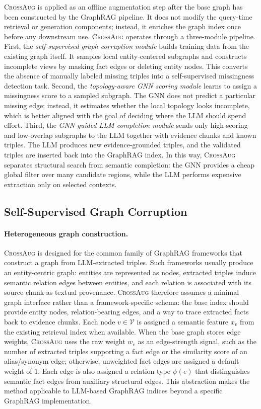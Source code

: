 \documentclass[11pt]{article}
\newcommand{\ours}{\textsc{CrossAug}\xspace}
\begin{document}
\ours is applied as an offline augmentation step after the base graph has been constructed by the GraphRAG pipeline. It does not modify the query-time retrieval or generation components; instead, it enriches the graph index once before any downstream use. \ours operates through a three-module pipeline. First, the \textit{self-supervised graph corruption module} builds training data from the existing graph itself. It samples local entity-centered subgraphs and constructs incomplete views by masking fact edges or deleting entity nodes. This converts the absence of manually labeled missing triples into a self-supervised missingness detection task. Second, the \textit{topology-aware GNN scoring module} learns to assign a missingness score to a sampled subgraph. The GNN does not predict a particular missing edge; instead, it estimates whether the local topology looks incomplete, which is better aligned with the goal of deciding where the LLM should spend effort. Third, the \textit{GNN-guided LLM completion module} sends only high-scoring and low-overlap subgraphs to the LLM together with evidence chunks and known triples. The LLM produces new evidence-grounded triples, and the validated triples are inserted back into the GraphRAG index. In this way, \ours separates structural search from semantic completion: the GNN provides a cheap global filter over many candidate regions, while the LLM performs expensive extraction only on selected contexts.

\subsection{Self-Supervised Graph Corruption}

\paragraph{Heterogeneous graph construction.}
\ours is designed for the common family of GraphRAG frameworks that construct a graph from LLM-extracted triples. Such frameworks usually produce an entity-centric graph: entities are represented as nodes, extracted triples induce semantic relation edges between entities, and each relation is associated with its source chunk as textual provenance. \ours therefore assumes a minimal graph interface rather than a framework-specific schema: the base index should provide entity nodes, relation-bearing edges, and a way to trace extracted facts back to evidence chunks. Each node $v \in \mathcal{V}$ is assigned a semantic feature $x_v$ from the existing retrieval index when available. When the base graph stores edge weights, \ours uses the raw weight $w_e$ as an edge-strength signal, such as the number of extracted triples supporting a fact edge or the similarity score of an alias/synonym edge; otherwise, unweighted fact edges are assigned a default weight of $1$. Each edge is also assigned a relation type $\psi(e)$ that distinguishes semantic fact edges from auxiliary structural edges. This abstraction makes the method applicable to LLM-based GraphRAG indices beyond a specific GraphRAG implementation.
\end{document}
